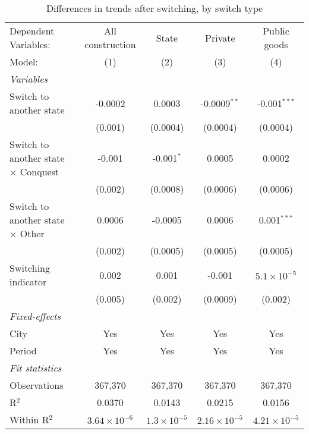 \begin{table}[htbp]
   \caption{\label{tab:window_1y} Differences in trends after switching, by switch type}
   \centering
   \begin{tabular}{lcccc}
      \tabularnewline \midrule \midrule
      Dependent Variables:                       & All construction      & State                & Private               & Public goods\\  
      Model:                                     & (1)                   & (2)                  & (3)                   & (4)\\  
      \midrule
      \emph{Variables}\\
      Switch to another state                    & -0.0002               & 0.0003               & -0.0009$^{**}$        & -0.001$^{***}$\\   
                                                 & (0.001)               & (0.0004)             & (0.0004)              & (0.0004)\\   
      Switch to another state $\times$ Conquest  & -0.001                & -0.001$^{*}$         & 0.0005                & 0.0002\\   
                                                 & (0.002)               & (0.0008)             & (0.0006)              & (0.0006)\\   
      Switch to another state $\times$ Other     & 0.0006                & -0.0005              & 0.0006                & 0.001$^{***}$\\   
                                                 & (0.002)               & (0.0005)             & (0.0005)              & (0.0005)\\   
      Switching indicator                        & 0.002                 & 0.001                & -0.001                & $5.1\times 10^{-5}$\\    
                                                 & (0.005)               & (0.002)              & (0.0009)              & (0.002)\\   
      \midrule
      \emph{Fixed-effects}\\
      City                                       & Yes                   & Yes                  & Yes                   & Yes\\  
      Period                                     & Yes                   & Yes                  & Yes                   & Yes\\  
      \midrule
      \emph{Fit statistics}\\
      Observations                               & 367,370               & 367,370              & 367,370               & 367,370\\  
      R$^2$                                      & 0.0370                & 0.0143               & 0.0215                & 0.0156\\  
      Within R$^2$                               & $3.64\times 10^{-6}$  & $1.3\times 10^{-5}$  & $2.16\times 10^{-5}$  & $4.21\times 10^{-5}$\\   
      \midrule \midrule
      

\end{tabular}
\end{table}
